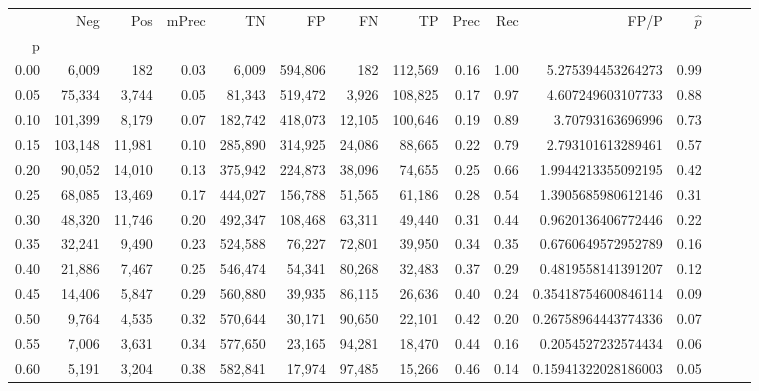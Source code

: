 \begin{tabular}{rrrrrrrrrrrrrrr}
\toprule
{} &      Neg &     Pos & mPrec &       TN &       FP &       FN &       TP &  Prec &   Rec &                  FP/P & $\hat{p}$ \\
p    &          &         &       &          &          &          &          &       &       &                       &           \\
\midrule
0.00 &    6,009 &     182 &  0.03 &    6,009 &  594,806 &      182 &  112,569 &  0.16 &  1.00 &     5.275394453264273 &      0.99 \\
0.05 &   75,334 &   3,744 &  0.05 &   81,343 &  519,472 &    3,926 &  108,825 &  0.17 &  0.97 &     4.607249603107733 &      0.88 \\
0.10 &  101,399 &   8,179 &  0.07 &  182,742 &  418,073 &   12,105 &  100,646 &  0.19 &  0.89 &      3.70793163696996 &      0.73 \\
0.15 &  103,148 &  11,981 &  0.10 &  285,890 &  314,925 &   24,086 &   88,665 &  0.22 &  0.79 &     2.793101613289461 &      0.57 \\
0.20 &   90,052 &  14,010 &  0.13 &  375,942 &  224,873 &   38,096 &   74,655 &  0.25 &  0.66 &    1.9944213355092195 &      0.42 \\
0.25 &   68,085 &  13,469 &  0.17 &  444,027 &  156,788 &   51,565 &   61,186 &  0.28 &  0.54 &    1.3905685980612146 &      0.31 \\
0.30 &   48,320 &  11,746 &  0.20 &  492,347 &  108,468 &   63,311 &   49,440 &  0.31 &  0.44 &    0.9620136406772446 &      0.22 \\
0.35 &   32,241 &   9,490 &  0.23 &  524,588 &   76,227 &   72,801 &   39,950 &  0.34 &  0.35 &    0.6760649572952789 &      0.16 \\
0.40 &   21,886 &   7,467 &  0.25 &  546,474 &   54,341 &   80,268 &   32,483 &  0.37 &  0.29 &    0.4819558141391207 &      0.12 \\
0.45 &   14,406 &   5,847 &  0.29 &  560,880 &   39,935 &   86,115 &   26,636 &  0.40 &  0.24 &   0.35418754600846114 &      0.09 \\
0.50 &    9,764 &   4,535 &  0.32 &  570,644 &   30,171 &   90,650 &   22,101 &  0.42 &  0.20 &   0.26758964443774336 &      0.07 \\
0.55 &    7,006 &   3,631 &  0.34 &  577,650 &   23,165 &   94,281 &   18,470 &  0.44 &  0.16 &    0.2054527232574434 &      0.06 \\
0.60 &    5,191 &   3,204 &  0.38 &  582,841 &   17,974 &   97,485 &   15,266 &  0.46 &  0.14 &   0.15941322028186003 &      0.05 \\

\end{tabular}
